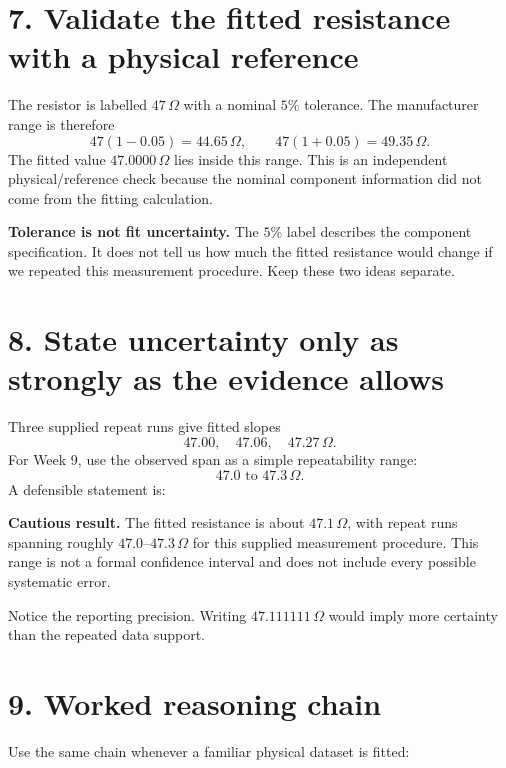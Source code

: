 \documentclass[11pt,a4paper]{article}
\begin{document}
\section*{7. Validate the fitted resistance with a physical reference}
The resistor is labelled $47\,\Omega$ with a nominal $5\%$ tolerance. The manufacturer range is therefore
\[
47(1-0.05)=44.65\,\Omega,
\qquad
47(1+0.05)=49.35\,\Omega.
\]
The fitted value $47.0000\,\Omega$ lies inside this range. This is an independent physical/reference check because the nominal component information did not come from the fitting calculation.

\begin{aibox}\textbf{Tolerance is not fit uncertainty.} The $5\%$ label describes the component specification. It does not tell us how much the fitted resistance would change if we repeated this measurement procedure. Keep these two ideas separate.\end{aibox}

\section*{8. State uncertainty only as strongly as the evidence allows}
Three supplied repeat runs give fitted slopes
\[
47.00,\quad47.06,\quad47.27\,\Omega.
\]
For Week 9, use the observed span as a simple repeatability range:
\[
47.0\text{ to }47.3\,\Omega.
\]
A defensible statement is:

\begin{keybox}\textbf{Cautious result.} The fitted resistance is about $47.1\,\Omega$, with repeat runs spanning roughly $47.0$--$47.3\,\Omega$ for this supplied measurement procedure. This range is not a formal confidence interval and does not include every possible systematic error.\end{keybox}

Notice the reporting precision. Writing $47.111111\,\Omega$ would imply more certainty than the repeated data support.

\section*{9. Worked reasoning chain}
Use the same chain whenever a familiar physical dataset is fitted:
\end{document}
